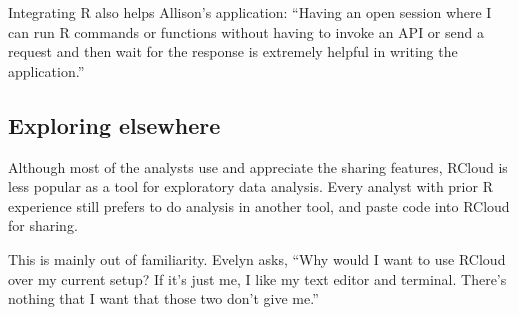 Integrating R also helps Allison's application: ``Having an open session where I can run R commands or
functions without having to invoke an API or send a request and then
wait for the response is extremely helpful in writing the application.''




\subsection{Exploring elsewhere}

Although most of the analysts use and appreciate the sharing features,
RCloud is less popular as a tool for exploratory data analysis. Every
analyst with prior R experience still prefers to do analysis in another
tool, and paste code into RCloud for sharing.

This is mainly out of familiarity. Evelyn asks, ``Why would I want to use
RCloud over my current setup? If it's just me, I like my text editor and
terminal. There's nothing that I want that those two don't give me.''




